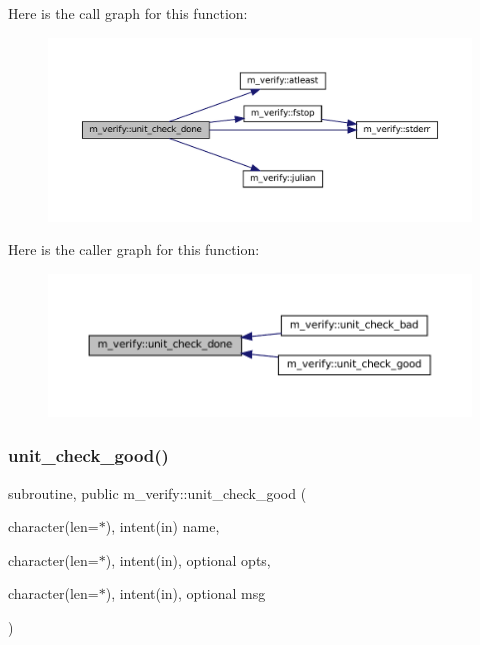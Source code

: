 Here is the call graph for this function\+:\nopagebreak
\begin{figure}[H]
\begin{center}
\leavevmode
\includegraphics[width=350pt]{namespacem__verify_a0c0ed723b61b2cbbebb81fa91edd1941_cgraph}
\end{center}
\end{figure}
Here is the caller graph for this function\+:\nopagebreak
\begin{figure}[H]
\begin{center}
\leavevmode
\includegraphics[width=350pt]{namespacem__verify_a0c0ed723b61b2cbbebb81fa91edd1941_icgraph}
\end{center}
\end{figure}
\mbox{\label{namespacem__verify_a9d5ed59a1ac977dd7ab23e0d1fb54de4}} 
\subsubsection{\texorpdfstring{unit\+\_\+check\+\_\+good()}{unit\_check\_good()}}
{\footnotesize\ttfamily subroutine, public m\+\_\+verify\+::unit\+\_\+check\+\_\+good (\begin{DoxyParamCaption}\item[{character(len=$\ast$), intent(in)}]{name,  }\item[{character(len=$\ast$), intent(in), optional}]{opts,  }\item[{character(len=$\ast$), intent(in), optional}]{msg }\end{DoxyParamCaption})}




